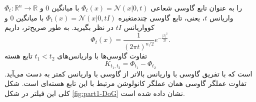         $\Phi_t : \mathbb{R}^n \rightarrow \mathbb{R}$ 
        را به عنوان تابع گاوسی شعاعی 
        $\Phi_t(x) = \mathcal{N}(x|0, t)$ 
        با میانگین 
        $0$ 
        و واریانس 
        $t$، 
        یعنی، تابع گاوسی چندمتغیره 
        $\Phi_t(x) = \mathcal{N}(x|0, tI)$ 
        با میانگین 
        $0$ 
        و کوواریانس 
        $tI$ 
        در نظر بگیرید. به طور صریح‌تر، داریم
        \[
        \Phi_t(x) = \frac{1}{(2\pi t)^{n/2}} e^{-\frac{|x|^2}{2t}}.
        \]
        تفاوت گاوسی‌ها با واریانس‌های 
        $t_1 < t_2$ 
        تابع هسته
        \[
        K_{t_1, t_2} = \Phi_{t_1} - \Phi_{t_2}
        \]
        است که با تفریق گاوسی با واریانس بالاتر از گاوسی با واریانس کمتر به دست می‌آید. تفاوت عملگر گاوسی همان عملگر کانولوشن مرتبط با این تابع هسته‌ای است. شکل کلی این فیلتر در شکل 
        \ref{fig:part1-DoG}
        نشان داده شده است.
